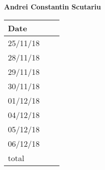 \documentclass[../main.tex]{subfiles}
\begin{document}
\begin{center}
{\bf Andrei Constantin Scutariu}
	\vspace{2mm}

		\begin{tabular}{p{1.3cm}|p{1.8cm}|p{6.7cm}}
			\hline
			\bf Date & \bf \makebox[1.8cm][c]{Hours} & \bf \makebox[6.7cm][c]{Description} \\
			\hline
			25/11/18 & \makebox[1.8cm][c]{0.5h} & \makebox[6.7cm][c]{Initial Structure}\\
			28/11/18 & \makebox[1.8cm][c]{0.5h} & \makebox[6.7cm][c]{Introduction}\\
			29/11/18 & \makebox[1.8cm][c]{2h} & \makebox[6.7cm][c]{Component view}\\
			30/11/18 & \makebox[1.8cm][c]{1h} & \makebox[6.7cm][c]{Component view}\\
			01/12/18 & \makebox[1.8cm][c]{1h} & \makebox[6.7cm][c]{Requirements traceability}\\
			04/12/18 & \makebox[1.8cm][c]{2h} & \makebox[6.7cm][c]{Reviewing}\\
			05/12/18 & \makebox[1.8cm][c]{2h} & \makebox[6.7cm][c]{Architectural styles and patterns}\\
			06/12/18 & \makebox[1.8cm][c]{4h} & \makebox[6.7cm][c]{Component Interfaces}\\
			total    & \makebox[1.8cm][c]{7h}
		\end{tabular}
\end{center}
\vspace{1cm}
\end{document}
